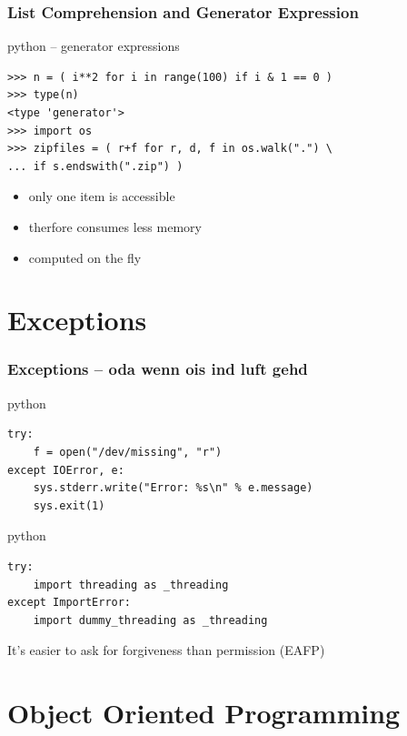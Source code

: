 \documentclass{beamer}
\begin{document}
\begin{frame}[fragile]
	\frametitle{List Comprehension and Generator Expression}
	\begin{exampleblock}{python -- generator expressions}
	\begin{lstlisting}
>>> n = ( i**2 for i in range(100) if i & 1 == 0 )
>>> type(n)
<type 'generator'>
>>> import os
>>> zipfiles = ( r+f for r, d, f in os.walk(".") \ 
... if s.endswith(".zip") )
	\end{lstlisting}
	\end{exampleblock}
\pause
	\begin{itemize}
		\item only one item is accessible
		\item therfore consumes less memory
		\item computed on the fly
	\end{itemize}
\end{frame}

\section{Exceptions}	%

\begin{frame}[fragile]
	\frametitle{Exceptions -- oda wenn ois ind luft gehd}
	\begin{exampleblock}{python}
	\begin{lstlisting}
try:
    f = open("/dev/missing", "r")
except IOError, e:
    sys.stderr.write("Error: %s\n" % e.message)
    sys.exit(1)
	\end{lstlisting}
	\end{exampleblock}

\pause

	\begin{exampleblock}{python}
	\begin{lstlisting}
try:
    import threading as _threading
except ImportError:
    import dummy_threading as _threading
	\end{lstlisting}
	\end{exampleblock}
	
	It's easier to ask for forgiveness than permission (EAFP)
\end{frame}

\section{Object Oriented Programming}
\end{document}
